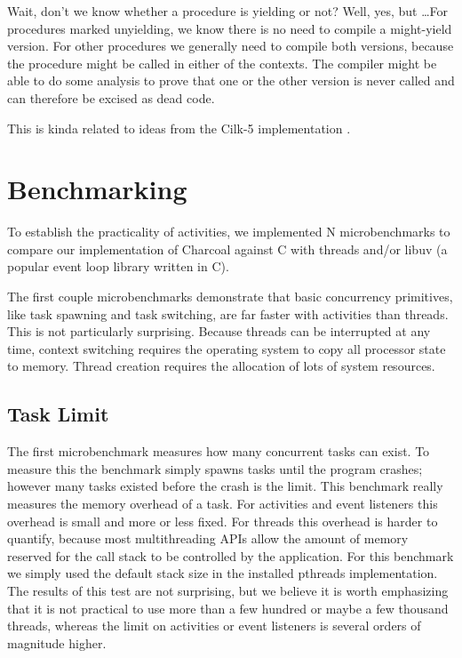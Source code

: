 \documentclass[10pt,preprint]{sigplanconf}
\begin{document}
Wait, don't we know whether a procedure is yielding or not?  Well, yes,
but \ldots For procedures marked unyielding, we know there is no need to
compile a might-yield version.  For other procedures we generally need
to compile both versions, because the procedure might be called in
either of the contexts.  The compiler might be able to do some analysis
to prove that one or the other version is never called and can therefore
be excised as dead code.

This is kinda related to ideas from the Cilk-5 implementation
\cite{Frigo1998}.


\section{Benchmarking}

To establish the practicality of activities, we implemented N
microbenchmarks to compare our implementation of Charcoal against C with
threads and/or libuv (a popular event loop library written in C).

The first couple microbenchmarks demonstrate that basic concurrency primitives, like task spawning and task switching, are far faster with activities than threads.
This is not particularly surprising.
Because threads can be interrupted at any time, context switching requires the operating system to copy all processor state to memory.
Thread creation requires the allocation of lots of system resources.

\subsection{Task Limit}

The first microbenchmark measures how many concurrent tasks can exist.
To measure this the benchmark simply spawns tasks until the program crashes; however many tasks existed before the crash is the limit.
This benchmark really measures the memory overhead of a task.
For activities and event listeners this overhead is small and more or less fixed.
For threads this overhead is harder to quantify, because most multithreading APIs allow the amount of memory reserved for the call stack to be controlled by the application.
For this benchmark we simply used the default stack size in the installed pthreads implementation.
The results of this test are not surprising, but we believe it is worth emphasizing that it is not practical to use more than a few hundred or maybe a few thousand threads, whereas the limit on activities or event listeners is several orders of magnitude higher.
\end{document}
